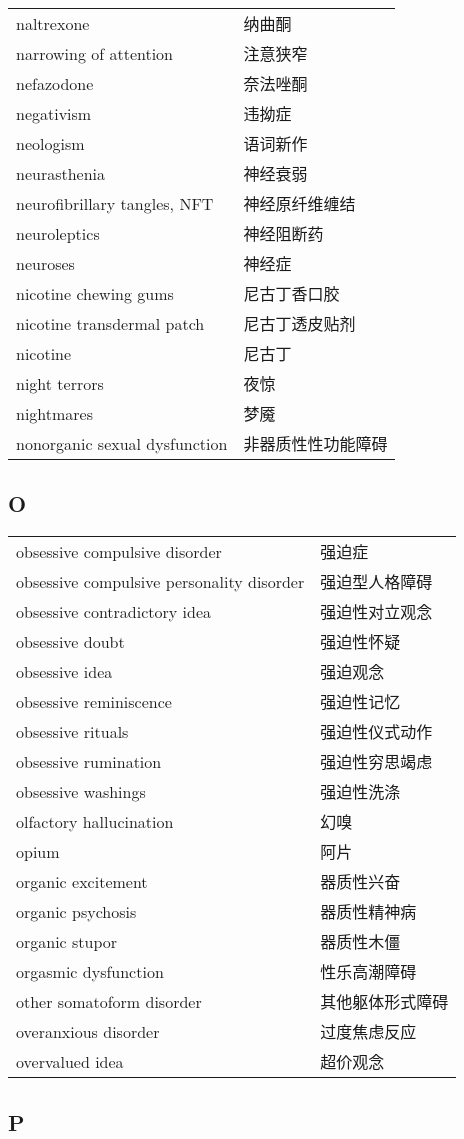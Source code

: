 \begin{longtable}[]{@{}ll@{}}
\toprule
\endhead
naltrexone & 纳曲酮\tabularnewline
narrowing of attention & 注意狭窄\tabularnewline
nefazodone & 奈法唑酮\tabularnewline
negativism & 违拗症\tabularnewline
neologism & 语词新作\tabularnewline
neurasthenia & 神经衰弱\tabularnewline
neurofibrillary tangles, NFT & 神经原纤维缠结\tabularnewline
neuroleptics & 神经阻断药\tabularnewline
neuroses & 神经症\tabularnewline
nicotine chewing gums & 尼古丁香口胶\tabularnewline
nicotine transdermal patch & 尼古丁透皮贴剂\tabularnewline
nicotine & 尼古丁\tabularnewline
night terrors & 夜惊\tabularnewline
nightmares & 梦魇\tabularnewline
nonorganic sexual dysfunction & 非器质性性功能障碍\tabularnewline
\bottomrule
\end{longtable}

\subsection*{O}

\begin{longtable}[]{@{}ll@{}}
\toprule
\endhead
obsessive compulsive disorder & 强迫症\tabularnewline
obsessive compulsive personality disorder &
强迫型人格障碍\tabularnewline
obsessive contradictory idea & 强迫性对立观念\tabularnewline
obsessive doubt & 强迫性怀疑\tabularnewline
obsessive idea & 强迫观念\tabularnewline
obsessive reminiscence & 强迫性记忆\tabularnewline
obsessive rituals & 强迫性仪式动作\tabularnewline
obsessive rumination & 强迫性穷思竭虑\tabularnewline
obsessive washings & 强迫性洗涤\tabularnewline
olfactory hallucination & 幻嗅\tabularnewline
opium & 阿片\tabularnewline
organic excitement & 器质性兴奋\tabularnewline
organic psychosis & 器质性精神病\tabularnewline
organic stupor & 器质性木僵\tabularnewline
orgasmic dysfunction & 性乐高潮障碍\tabularnewline
other somatoform disorder & 其他躯体形式障碍\tabularnewline
overanxious disorder & 过度焦虑反应\tabularnewline
overvalued idea & 超价观念\tabularnewline
\bottomrule
\end{longtable}

\subsection*{P}

